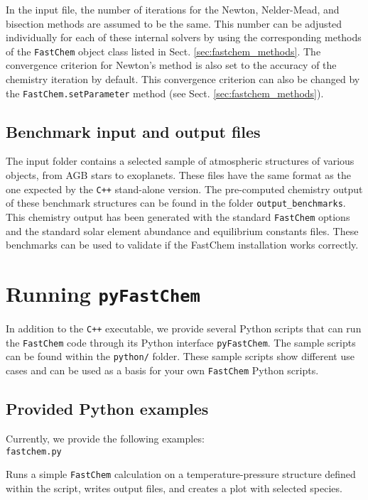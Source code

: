 \documentclass[numbers=noenddot]{aux/fcmanual}
\newcommand{\fc}{\texttt{FastChem}\xspace}
\newcommand{\pfc}{\texttt{pyFastChem}\xspace}
\newcommand{\cpp}{\ttt{C++}\xspace}
\newcommand{\ttt}[1]{\texttt {#1}}
\begin{document}
In the input file, the number of iterations for the Newton, Nelder-Mead, and bisection methods are assumed to be the same. This number can be adjusted individually for each of these internal solvers by using the corresponding methods of the \fc object class listed in Sect. \ref{sec:fastchem_methods}. The convergence criterion for Newton's method is also set to the accuracy of the chemistry iteration by default. This convergence criterion can also be changed by the \lstinline!FastChem.setParameter! method (see Sect. \ref{sec:fastchem_methods}).


\section{Benchmark input and output files}

The input folder contains a selected sample of atmospheric structures of various objects, from AGB stars to exoplanets. These files have the same format as the one expected by the \cpp stand-alone version. The pre-computed chemistry output of these benchmark structures can be found in the folder \texttt{output\_benchmarks}. This chemistry output has been generated with the standard \fc options and the standard solar element abundance and equilibrium constants files. These benchmarks can be used to validate if the FastChem installation works correctly.


\chapter{Running \pfc}

In addition to the \cpp executable, we provide several Python scripts that can run the \fc code through its Python interface \pfc. The sample scripts can be found within the \verb|python/| folder. These sample scripts show different use cases and can be used as a basis for your own \fc Python scripts.

\section{Provided Python examples}
\label{sec:pyfc_examples}
Currently, we provide the following examples:\\

\lstinline!fastchem.py!
\begin{addmargin}[25pt]{0pt}
  Runs a simple \fc calculation on a temperature-pressure structure defined within the script, writes output files, and creates a plot with selected species.\\
\end{addmargin}
\end{document}
